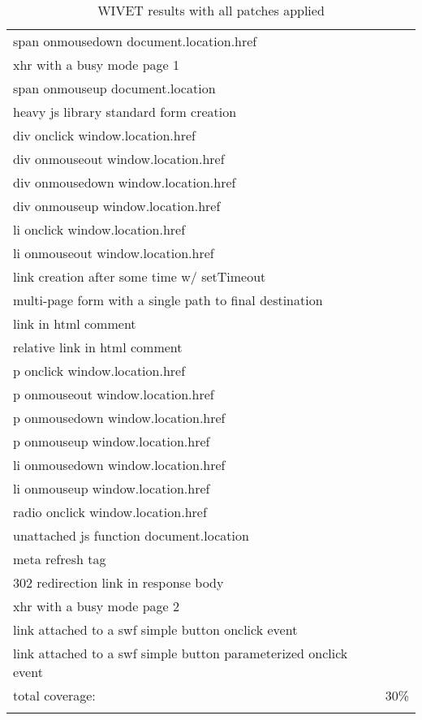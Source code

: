 \begin {longtable}{| p{} c |}
span onmousedown document.location.href						& \cmark \\
xhr with a busy mode page 1									& \xmark \\
span onmouseup document.location							& \xmark \\
heavy js library standard form creation						& \xmark \\
div onclick window.location.href							& \xmark \\
div onmouseout window.location.href							& \cmark \\
div onmousedown window.location.href						& \xmark \\
div onmouseup window.location.href							& \xmark \\
li onclick window.location.href								& \xmark \\
li onmouseout window.location.href							& \cmark \\
link creation after some time w/ setTimeout					& \xmark \\
multi-page form with a single path to final destination		& \xmark \\
link in html comment										& \xmark \\
relative link in html comment								& \xmark \\
p onclick window.location.href								& \xmark \\
p onmouseout window.location.href							& \xmark \\
p onmousedown window.location.href							& \xmark \\
p onmouseup window.location.href							& \xmark \\
li onmousedown window.location.href							& \xmark \\
li onmouseup window.location.href							& \xmark \\
radio onclick window.location.href							& \xmark \\
unattached js function document.location					& \xmark \\
meta refresh tag											& \cmark \\
302 redirection link in response body						& \xmark \\
xhr with a busy mode page 2									& \xmark \\
link attached to a swf simple button onclick event			& \xmark \\
link attached to a swf simple button parameterized onclick event	& \xmark 	\\ 
\hline
%
total coverage:												& 30\%	\\ \hline

	\caption{WIVET results with all patches applied}\label{tab:extended2}
	\end {longtable}
	\egroup